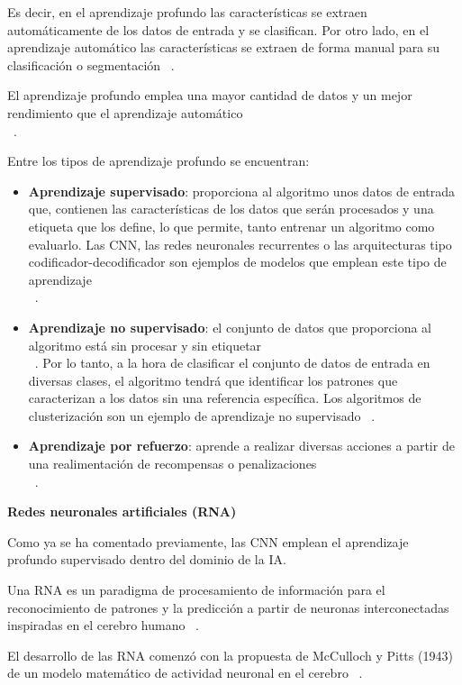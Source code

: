 Es decir, en el aprendizaje profundo las características se extraen automáticamente de los datos de entrada y se clasifican. Por otro lado, en el aprendizaje automático las características se extraen de forma manual para su clasificación o segmentación ~\cite{kundu2021pneumonia}.

El aprendizaje profundo emplea una mayor cantidad de datos y un mejor rendimiento que el aprendizaje automático\\ ~\cite{diego23}.


Entre los tipos de aprendizaje profundo se encuentran:
\begin{itemize}
    \item \textbf{Aprendizaje supervisado}: proporciona al algoritmo unos datos de entrada que, contienen las características de los datos que serán procesados y una etiqueta que los define, lo que permite, tanto entrenar un algoritmo como evaluarlo. Las CNN, las redes neuronales recurrentes o las arquitecturas tipo codificador-decodificador son ejemplos de modelos que emplean este tipo de aprendizaje\\ ~\cite{diego23}.
    \item \textbf{Aprendizaje no supervisado}: el conjunto de datos que proporciona al algoritmo está sin procesar y sin etiquetar\\ ~\cite{sindhu2020survey}. Por lo tanto, a la hora de clasificar el conjunto de datos de entrada en diversas clases, el algoritmo tendrá que identificar los patrones que caracterizan a los datos sin una referencia específica. Los algoritmos de clusterización son un ejemplo de aprendizaje no supervisado ~\cite{diego23}.
    \item \textbf{Aprendizaje por refuerzo}: aprende a realizar diversas acciones a partir de una realimentación de recompensas o penalizaciones\\ ~\cite{diego23}.
\end{itemize}

\textbf{Redes neuronales artificiales (RNA)}

Como ya se ha comentado previamente, las CNN emplean el aprendizaje profundo supervisado dentro del dominio de la IA. 

Una RNA es un paradigma de procesamiento de información para el reconocimiento de patrones y la predicción a partir de neuronas interconectadas inspiradas en el cerebro humano ~\cite{walczak2019artificial}.

El desarrollo de las RNA comenzó con la propuesta de McCulloch y Pitts (1943) de un modelo matemático de actividad neuronal en el cerebro ~\cite{walczak2019artificial}.

